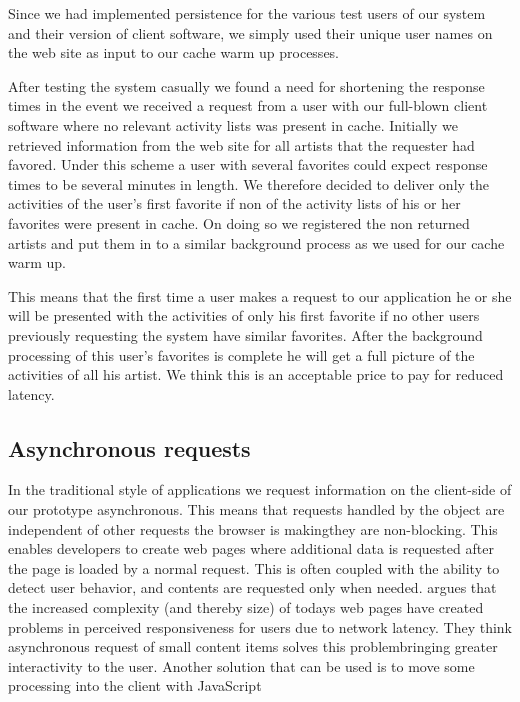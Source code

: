 Since we had implemented persistence for the various test users of our system
and their version of client software, we simply used their unique user names
on the \urort{} web site as input to our cache warm up processes.

After testing the system casually we found a need for shortening the response
times in the event we received a request from a user with our full-blown
client software where no relevant activity lists
was present in cache. Initially we retrieved information from the \urort{} web
site for all artists that the requester had favored. Under this scheme a
user with several favorites could expect response times to be several minutes
in length. We therefore decided to deliver only the activities of the user's
first favorite if non of the activity lists of his or her favorites were
present in cache. On doing so we registered the non returned artists and put
them in to a similar background process as we used for our cache warm up. 

This means that the first time a user makes a request to our application he
or she will be presented with the activities of only his first favorite if no
other users previously requesting the system have similar favorites. After the
background processing of this user's favorites is complete he will get a full
picture of the activities of all his artist. We think this is an acceptable
price to pay for reduced latency.

\subsection{Asynchronous requests}

In the traditional style of  applications we request information on
the client-side of our prototype asynchronous.%
This means that requests handled by the  object
are independent of other requests the browser is making\dash{}they
are non-blocking. This enables developers to create web pages where additional
data is requested after the page is loaded by a normal  request.
This is often coupled with the ability to detect user behavior, and contents
are requested only when needed. \citet[pp.281--282]{stamey06} argues that
the increased complexity (and thereby size) of todays web pages have created
problems in perceived responsiveness for users due to network latency. They
think asynchronous request of small content items solves this
problem\dash{}bringing greater interactivity to the user. Another solution
that can be used is to move some processing into the client with
JavaScript \citep[]{jazayeri07}

